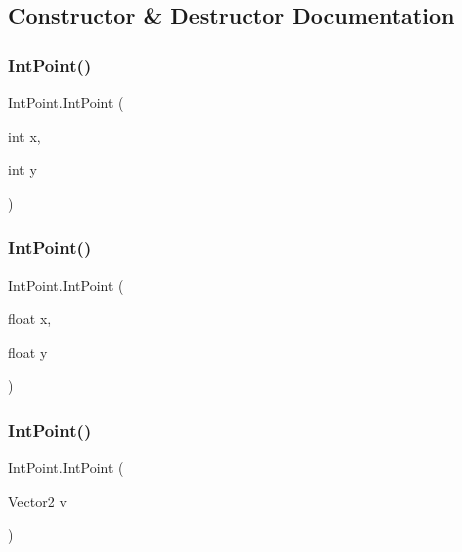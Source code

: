 \subsection{Constructor \& Destructor Documentation}
\mbox{\label{struct_int_point_a553ad71275bc778ad20bda98cb3b760c}} 
\subsubsection{\texorpdfstring{Int\+Point()}{IntPoint()}\hspace{0.1cm}{\footnotesize\ttfamily [1/3]}}
{\footnotesize\ttfamily Int\+Point.\+Int\+Point (\begin{DoxyParamCaption}\item[{int}]{x,  }\item[{int}]{y }\end{DoxyParamCaption})}

\mbox{\label{struct_int_point_a89c7250ab8d007dfc10123d4eb5a32ca}} 
\subsubsection{\texorpdfstring{Int\+Point()}{IntPoint()}\hspace{0.1cm}{\footnotesize\ttfamily [2/3]}}
{\footnotesize\ttfamily Int\+Point.\+Int\+Point (\begin{DoxyParamCaption}\item[{float}]{x,  }\item[{float}]{y }\end{DoxyParamCaption})}

\mbox{\label{struct_int_point_ab12389b14a95036d62ab7449458b0da1}} 
\subsubsection{\texorpdfstring{Int\+Point()}{IntPoint()}\hspace{0.1cm}{\footnotesize\ttfamily [3/3]}}
{\footnotesize\ttfamily Int\+Point.\+Int\+Point (\begin{DoxyParamCaption}\item[{Vector2}]{v }\end{DoxyParamCaption})}



